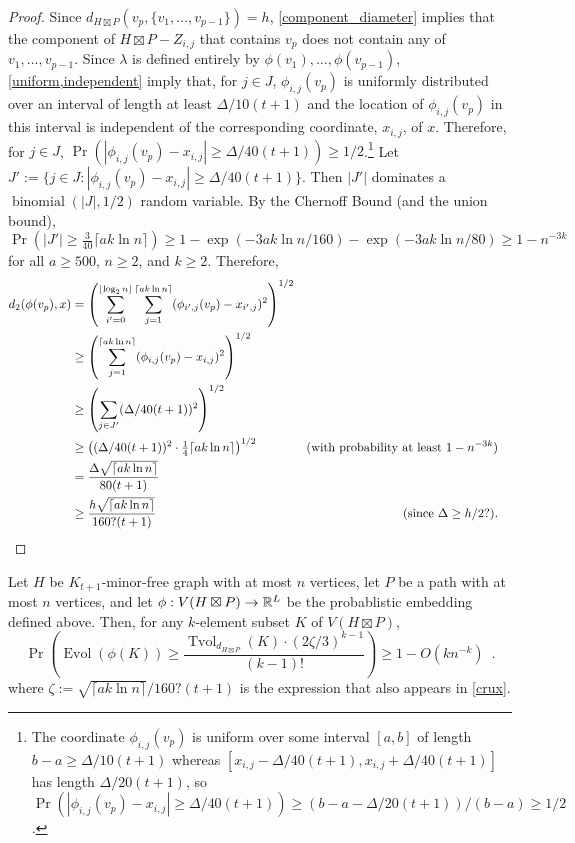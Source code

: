 \documentclass{patmorin}
\DeclareMathOperator{\evol}{Evol}
\DeclareMathOperator{\tvol}{Tvol}
\begin{document}
\begin{proof}
  Since $d_{H\boxtimes P}(v_p,\{v_1,\ldots,v_{p-1}\})= h$, \cref{component_diameter} implies that the component of $H\boxtimes P-Z_{i,j}$ that contains $v_p$ does not contain any of $v_1,\ldots,v_{p-1}$. Since $\lambda$ is defined entirely by $\phi(v_1),\ldots,\phi(v_{p-1})$,   \cref{uniform,independent} imply that, for $j\in J$, $\phi_{i,j}(v_p)$ is uniformly distributed over an interval of length at least $\Delta/10(t+1)$ and the location of $\phi_{i,j}(v_p)$ in this interval is independent of the corresponding coordinate, $x_{i,j}$, of $x$.
  Therefore, for $j\in J$, $\Pr(|\phi_{i,j}(v_p)-x_{i,j}|\ge \Delta/40(t+1))\ge 1/2$.\footnote{The coordinate $\phi_{i,j}(v_p)$ is uniform over some interval $[a,b]$ of length $b-a\ge \Delta/10(t+1)$ whereas $[x_{i,j}-\Delta/40(t+1),x_{i,j}+\Delta/40(t+1)]$ has length $\Delta/20(t+1)$, so $\Pr(|\phi_{i,j}(v_p)-x_{i,j}|\ge \Delta/40(t+1))\ge (b-a-\Delta/20(t+1))/(b-a)\ge 1/2$.}
  Let $J':=\{j\in J:  |\phi_{i,j}(v_p)-x_{i,j}|\ge \Delta/40(t+1)\}$.  Then $|J'|$ dominates a $\operatorname{binomial}(|J|,1/2)$ random variable.  By the Chernoff Bound (and the union bound), $\Pr(|J'|\ge \tfrac{3}{40}\lceil a k\ln n\rceil)\ge 1-\exp(-3ak\ln n/160)-\exp(-3ak\ln n/80)\ge 1-n^{-3k}$ for all $a\ge 500$, $n\ge 2$, and $k\ge 2$. Therefore,
  \begin{align*}
    d_2(\phi(v_p),x)
    & = \left(\sum_{i'=0}^{\lfloor\log_2 n\rfloor}\sum_{j=1}^{\lceil ak\ln  n\rceil}(\phi_{i',j}(v_p)-x_{i',j})^2\right)^{1/2} \\
    & \ge \left(\sum_{j=1}^{\lceil ak\ln  n\rceil}(\phi_{i,j}(v_p)-x_{i,j})^2\right)^{1/2} \\
    & \ge \left(\sum_{j\in J'}(\Delta/40(t+1))^2\right)^{1/2} \\
    & \ge \left((\Delta/40(t+1))^2\cdot \tfrac{1}{4}\lceil ak\ln  n\rceil\right)^{1/2}
      & \text{(with probability at least $1-n^{-3k}$)} \\
    & = \frac{\Delta\sqrt{\lceil ak\ln  n\rceil}}{80(t+1)} \\
    & \ge \frac{h\sqrt{\lceil ak\ln n\rceil}}{160?(t+1)}
     & \text{(since $\Delta\ge h/2?$)}. &
    \qedhere
  \end{align*}
\end{proof}

\begin{lem}\label{volume_preserver}
  Let $H$ be $K_{t+1}$-minor-free graph with at most $n$ vertices, let $P$ be a path with at most $n$ vertices, and let $\phi:V(H\boxtimes P)\to\mathbb{R}^L$ be the probablistic embedding defined above.  Then, for any $k$-element subset $K$ of $V(H\boxtimes P)$,
  \[
    \Pr\left(\evol(\phi(K)) \ge \frac{\tvol_{d_{H\boxtimes P}}(K)\cdot(2\zeta/3)^{k-1}}{(k-1)!}\right) \ge 1- O(kn^{-k}) \enspace .
  \]
  where $\zeta:=\sqrt{\lceil ak\ln n\rceil}/160?(t+1)$ is the expression that also appears in \cref{crux}.
\end{lem}
\end{document}
